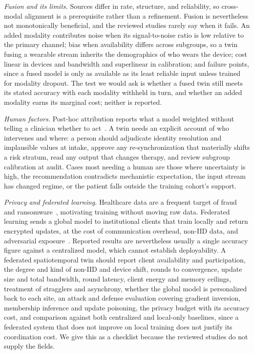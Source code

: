 \documentclass[journal]{IEEEtran}
\begin{document}
\emph{Fusion and its limits.} Sources differ in rate, structure, and reliability, so cross-modal alignment is a prerequisite rather than a refinement. Fusion is nevertheless not monotonically beneficial, and the reviewed studies rarely say when it fails. An added modality contributes noise when its signal-to-noise ratio is low relative to the primary channel; bias when availability differs across subgroups, so a twin fusing a wearable stream inherits the demographics of who wears the device; cost linear in devices and bandwidth and superlinear in calibration; and failure points, since a fused model is only as available as its least reliable input unless trained for modality dropout. The test we would ask is whether a fused twin still meets its stated accuracy with each modality withheld in turn, and whether an added modality earns its marginal cost; neither is reported.

\emph{Human factors.} Post-hoc attribution reports what a model weighted without telling a clinician whether to act~\cite{rudin2019stopexplaining,tonekaboni2019clinicians}. A twin needs an explicit account of who intervenes and where: a person should adjudicate identity resolution and implausible values at intake, approve any re-synchronization that materially shifts a risk stratum, read any output that changes therapy, and review subgroup calibration at audit. Cases most needing a human are those where uncertainty is high, the recommendation contradicts mechanistic expectation, the input stream has changed regime, or the patient falls outside the training cohort's support.

\emph{Privacy and federated learning.} Healthcare data are a frequent target of fraud and ransomware~\cite{Seh2020HealthcareDataBreaches}, motivating training without moving raw data. Federated learning sends a global model to institutional clients that train locally and return encrypted updates, at the cost of communication overhead, non-IID data, and adversarial exposure~\cite{prayitno2021FLhealthcare,aouedi2022FLmedical}. Reported results are nevertheless usually a single accuracy figure against a centralized model, which cannot establish deployability. A federated spatiotemporal twin should report client availability and participation, the degree and kind of non-IID and device shift, rounds to convergence, update size and total bandwidth, round latency, client energy and memory ceilings, treatment of stragglers and asynchrony, whether the global model is personalized back to each site, an attack and defense evaluation covering gradient inversion, membership inference and update poisoning, the privacy budget with its accuracy cost, and comparison against both centralized and local-only baselines, since a federated system that does not improve on local training does not justify its coordination cost. We give this as a checklist because the reviewed studies do not supply the fields.
\end{document}
